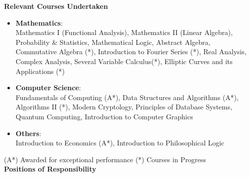 \documentclass[letterpaper,11pt]{article}
\begin{document}
{\vspace{-1pt}
\Large{\textbf{Relevant Courses Undertaken}}
\small
\vspace{-5pt}
\begin{itemize}
    \item \textbf{Mathematics}:\\
        Mathematics I (Functional Analysis), Mathematics II (Linear Algebra), Probability \& Statistics, Mathematical Logic, Abstract Algebra, Commutative Algebra (*), Introduction to Fourier Series (*), Real Analysis, Complex Analysis, Several Variable Calculus(*), Elliptic Curves and its Applications (*)\\
    \vspace{-2pt}
    \item \textbf{Computer Science}:\\
        Fundamentals of Computing (A*), Data Structures and Algorithms (A*), Algorithms II (*), Modern Cryptology, Principles of Database Systems, Quantum Computing, Introduction to Computer Graphics\\
    \vspace{-2pt}
    \item \textbf{Others}:\\
        Introduction to Economics (A*), Introduction to Philosophical Logic\\
    \vspace{-2pt}
\end{itemize}
\footnotesize{\hspace*{0.5in}(A*) Awarded for exceptional performance
\hspace{1.5in}  (*) Courses in Progress\\
\vspace{4pt}
\Large{\textbf{Positions of Responsibility}}
\small
\vspace{-5pt}

}}
\end{document}
